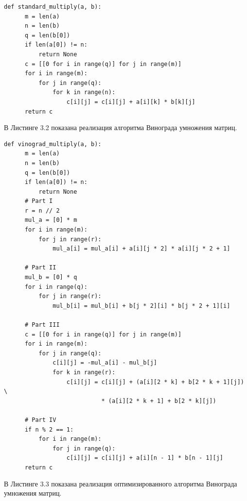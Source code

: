 \documentclass[a4paper,12pt]{report}
\begin{document}
\begin{lstlisting}[caption=Функция стандартного умножения матриц]
  def standard_multiply(a, b):
      m = len(a)
      n = len(b)
      q = len(b[0])
      if len(a[0]) != n:
          return None
      c = [[0 for i in range(q)] for j in range(m)]
      for i in range(m):
          for j in range(q):
              for k in range(n):
                  c[i][j] = c[i][j] + a[i][k] * b[k][j]
      return c
\end{lstlisting}
\newpage
В Листинге 3.2 показана реализация алгоритма Винограда умножения матриц.
\begin{lstlisting}[caption=Функция умножения матриц алгоритмом Винограда]
  def vinograd_multiply(a, b):
      m = len(a)
      n = len(b)
      q = len(b[0])
      if len(a[0]) != n:
          return None
      # Part I
      r = n // 2
      mul_a = [0] * m
      for i in range(m):
          for j in range(r):
              mul_a[i] = mul_a[i] + a[i][j * 2] * a[i][j * 2 + 1]

      # Part II
      mul_b = [0] * q
      for i in range(q):
          for j in range(r):
              mul_b[i] = mul_b[i] + b[j * 2][i] * b[j * 2 + 1][i]

      # Part III
      c = [[0 for i in range(q)] for j in range(m)]
      for i in range(m):
          for j in range(q):
              c[i][j] = -mul_a[i] - mul_b[j]
              for k in range(r):
                  c[i][j] = c[i][j] + (a[i][2 * k] + b[2 * k + 1][j]) \
                            * (a[i][2 * k + 1] + b[2 * k][j])

      # Part IV
      if n % 2 == 1:
          for i in range(m):
              for j in range(q):
                  c[i][j] = c[i][j] + a[i][n - 1] * b[n - 1][j]
      return c
\end{lstlisting}
\newpage
В Листинге 3.3 показана реализация оптимизированного алгоритма Винограда умножения матриц.
\end{document}
